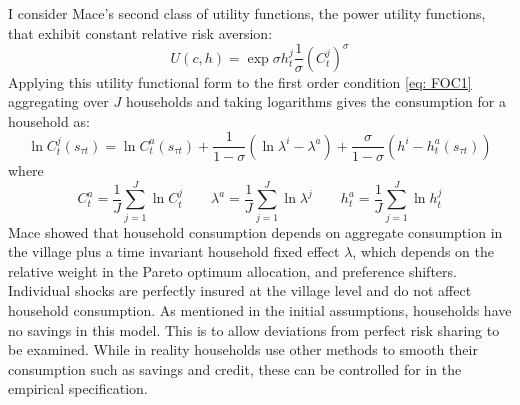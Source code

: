 I consider Mace's second class of utility functions, the power utility functions, that exhibit constant relative risk aversion: 
\begin{equation}
U(c,h)= \exp{\sigma h^j_t}\frac{1}{\sigma}(C^j_t)^{\sigma}
\end{equation}
Applying this utility functional form to the first order condition \eqref{eq: FOC1} aggregating over $J$ households and taking logarithms gives the consumption for a household as:
\begin{equation} \label{eq: consumption}
\ln C_t^j(s_{\tau t}) = \ln C^a_t(s_{\tau t}) + \frac{1}{1-\sigma}(\ln \lambda^i- \lambda^a) + \frac{\sigma}{1-\sigma}(h^i- h^a_t(s_{\tau t}))
\end{equation}
where
\[
C_t^a=\frac{1}{J} \sum_{j=1}^J \ln C_t^j \qquad \lambda^a=\frac{1}{J} \sum_{j=1}^J \ln \lambda^j \qquad  h^a_t=\frac{1}{J} \sum_{j=1}^J \ln h_t^j
\]
Mace showed that household consumption depends on aggregate consumption in the village plus a time invariant household fixed effect $\lambda$, which depends on the relative weight in the Pareto optimum allocation, and preference shifters. Individual shocks are perfectly insured at the village level and do not affect household consumption. As mentioned in the initial assumptions, households have no savings in this model. This is to allow deviations from perfect risk sharing to be examined. While in reality households use other methods to smooth their consumption such as savings and credit, these can be controlled for in the empirical specification. 

